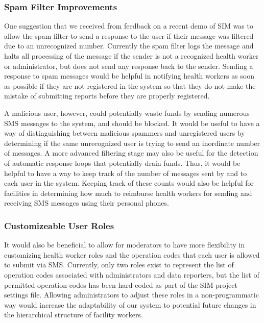 \documentclass{acm_proc_article-sp}
\begin{document}
\subsubsection{Spam Filter Improvements}

One suggestion that we received from feedback on a recent demo of SIM was to allow the spam filter to send a response to the user if their message was filtered due to an unrecognized number. Currently the spam filter logs the message and halts all processing of the message if the sender is not a recognized health worker or administrator, but does not send any response back to the sender. Sending a response to spam messages would be helpful in notifying health workers as soon as possible if they are not registered in the system so that they do not make the mistake of submitting reports before they are properly registered. 

A malicious user, however, could potentially waste funds by sending numerous SMS messages to the system, and should be blocked. It would be useful to have a way of distinguishing between malicious spammers and unregistered users by determining if the same unrecognized user is trying to send an inordinate number of messages. A more advanced filtering stage may also be useful for the detection of automatic response loops that potentially drain funds. Thus, it would be helpful to have a way to keep track of the number of messages sent by and to each user in the system. Keeping track of these counts would also be helpful for facilities in determining how much to reimburse health workers for sending and receiving SMS messages using their personal phones.

\subsubsection{Customizeable User Roles}

It would also be beneficial to allow for moderators to have more flexibility in customizing health worker roles and the operation codes that each user is allowed to submit via SMS. Currently, only two roles exist to represent the list of operation codes associated with administrators and data reporters, but the list of permitted operation codes has been hard-coded as part of the SIM project settings file. Allowing administrators to adjust these roles in a non-programmatic way would increase the adaptability of our system to potential future changes in the hierarchical structure of facility workers.
\end{document}
